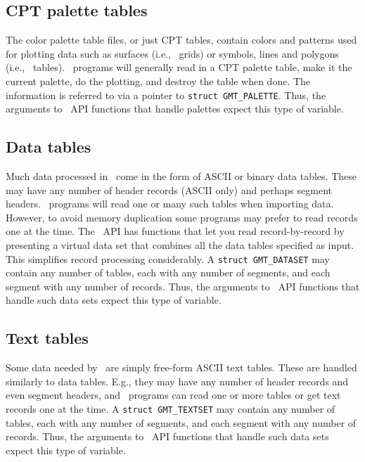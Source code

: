 \documentclass{report}
\begin{document}
\subsection{CPT palette tables}

The color palette table files, or just CPT tables, contain colors and patterns used for plotting
data such as surfaces (i.e., \GMT\ grids) or symbols, lines and polygons (i.e., \GMT\ tables).
\GMT\ programs will generally read in a CPT
palette table, make it the current palette, do the plotting, and destroy the table when done.
The information is referred to via a pointer to \texttt{struct GMT\_PALETTE}.  Thus, the
arguments to \GMT\ API functions that handle palettes expect this type of variable.

\subsection{Data tables}

Much data processed in \GMT\ come in the form of ASCII or binary data tables.  These may
have any number of header records (ASCII only) and perhaps segment headers.  \GMT\ programs will
read one or many such tables when importing data.  However, to avoid memory duplication some programs may prefer to read
records one at the time.  The \GMT\ API has functions that let you read record-by-record
by presenting a virtual data set that combines all the data tables specified as input.
This simplifies record processing considerably.  A \texttt{struct GMT\_DATASET} may contain
any number of tables, each with any number of segments, and each segment with any number of records.   Thus, the
arguments to \GMT\ API functions that handle such data sets expect this type of variable.

\subsection{Text tables}

Some data needed by \GMT\ are simply free-form ASCII text tables.  These are handled
similarly to data tables.  E.g., they may have any number of header records and even segment headers,
and \GMT\ programs can read one or more tables or get text records one at the time.
A \texttt{struct GMT\_TEXTSET} may contain
any number of tables, each with any number of segments, and each segment with any number of records.   Thus, the
arguments to \GMT\ API functions that handle such data sets expect this type of variable.
\end{document}
